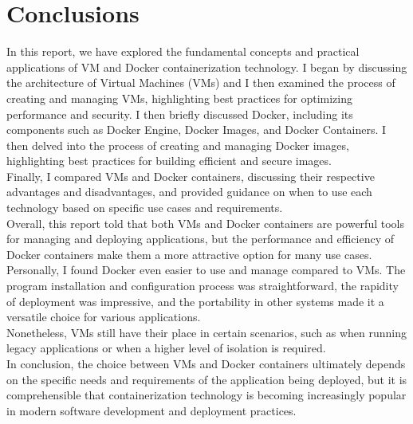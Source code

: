 \chapter{Conclusions}

In this report, we have explored the fundamental concepts and practical applications of VM and Docker containerization technology.
I began by discussing the architecture of Virtual Machines (VMs) and I then examined the process of creating and managing VMs,
highlighting best practices for optimizing performance and security.
I then briefly discussed Docker, including its components such as Docker Engine, Docker Images, and Docker Containers.
I then delved into the process of creating and managing Docker images, highlighting best practices for building efficient and secure images. \\
Finally, I compared VMs and Docker containers, discussing their respective advantages and disadvantages,
and provided guidance on when to use each technology based on specific use cases and requirements. \\
Overall, this report told that both VMs and Docker containers are powerful tools for managing and deploying applications,
but the performance and efficiency of Docker containers make them a more attractive option for many use cases. \\
Personally, I found Docker even easier to use and manage compared to VMs. The program installation and configuration process was straightforward,
the rapidity of deployment was impressive, and the portability in other systems made it a versatile choice for various applications. \\
Nonetheless, VMs still have their place in certain scenarios, such as when running legacy applications or when a higher level of isolation is required. \\
In conclusion, the choice between VMs and Docker containers ultimately depends on the specific needs and requirements of the application being deployed,
but it is comprehensible that containerization technology is becoming increasingly popular in modern software development and deployment practices.